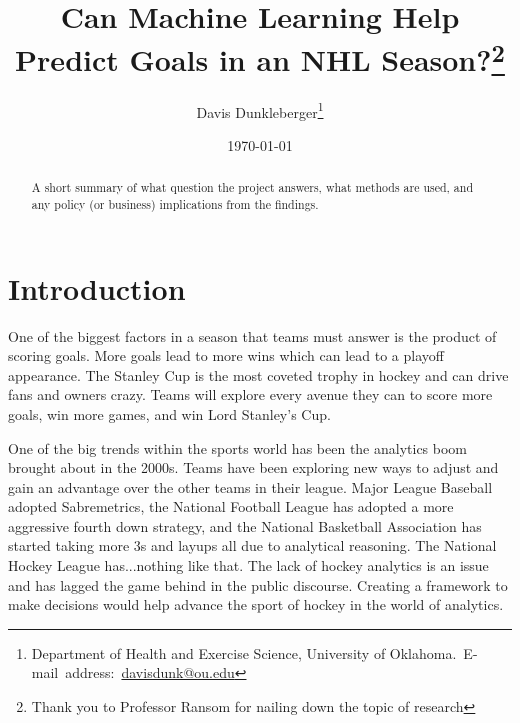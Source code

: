 \documentclass[12pt,english]{article}
\begin{document}
\begin{singlespace}
\title{Can Machine Learning Help Predict Goals in an NHL Season?\thanks{Thank you to Professor Ransom for nailing down the topic of research}}
\end{singlespace}

\author{Davis Dunkleberger\thanks{Department of Health and Exercise Science, University of Oklahoma.\
E-mail~address:~\href{mailto:student.name@ou.edu}{davisdunk@ou.edu}}}

\date{\today}

\maketitle

\begin{abstract}
\begin{singlespace}
A short summary of what question the project answers, what methods are used, and any policy (or business) implications from the findings.
\end{singlespace}

\end{abstract}
\vfill{}


\pagebreak{}


\section{Introduction}\label{sec:intro}
One of the biggest factors in a season that teams must answer is the product of scoring goals. More goals lead to more wins which can lead to a playoff appearance. The Stanley Cup is the most coveted trophy in hockey and can drive fans and owners crazy. Teams will explore every avenue they can to score more goals, win more games, and win Lord Stanley's Cup.

One of the big trends within the sports world has been the analytics boom brought about in the 2000s. Teams have been exploring new ways to adjust and gain an advantage over the other teams in their league. Major League Baseball adopted Sabremetrics, the National Football League has adopted a more aggressive fourth down strategy, and the National Basketball Association has started taking more 3s and layups all due to analytical reasoning. The National Hockey League has...nothing like that. The lack of hockey analytics is an issue and has lagged the game behind in the public discourse. Creating a framework to make decisions would help advance the sport of hockey in the world of analytics.
\end{document}
